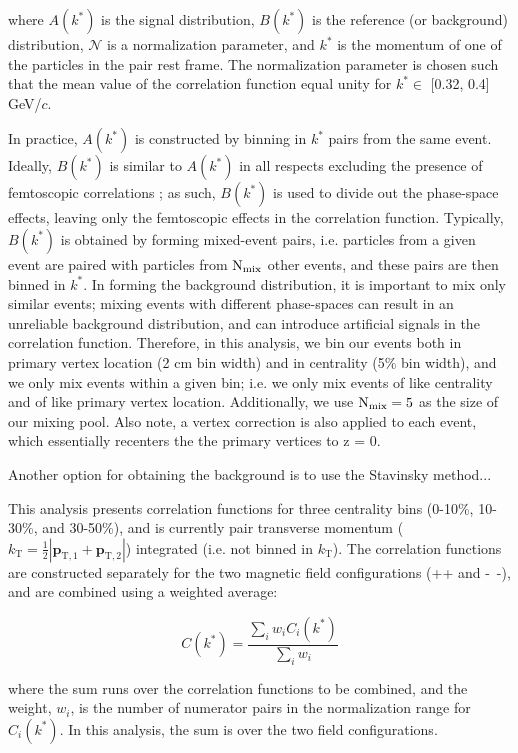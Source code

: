 \documentclass[ALICE,manyauthors]{cernphprep}
\newcommand{\kstar}{$k^{*}$\xspace}
\begin{document}
where $A(k^{*})$ is the signal distribution, $B(k^{*})$ is the reference (or background) distribution, $\mathcal{N}$ is a normalization parameter, and $k^{*}$ is the momentum of one of the particles in the pair rest frame.  The normalization parameter is chosen such that the mean value of the correlation function equal unity for \kstar $\in$ [0.32, 0.4] GeV/$c$.


In practice, $A(k^{*})$ is constructed by binning in \kstar pairs from the same event.
Ideally, $B(k^{*})$ is similar to $A(k^{*})$ in all respects excluding the presence of femtoscopic correlations \cite{Lisa:2005dd}; as such, $B(k^{*})$ is used to divide out the phase-space effects, leaving only the femtoscopic effects in the correlation function. 
Typically, $B(k^{*})$ is obtained by forming mixed-event pairs, i.e. particles from a given event are paired with particles from $\rm N_{mix}$ other events, and these pairs are then binned in \kstar.
In forming the background distribution, it is important to mix only similar events; mixing events with different phase-spaces can result in an unreliable background distribution, and can introduce artificial signals in the correlation function.
Therefore, in this analysis, we bin our events both in primary vertex location (2 cm bin width) and in centrality (5\% bin width), and we only mix events within a given bin; i.e. we only mix events of like centrality and of like primary vertex location.
Additionally, we use $\rm N_{mix} = 5$ as the size of our mixing pool.
Also note, a vertex correction is also applied to each event, which essentially recenters the the primary vertices to z = 0.

Another option for obtaining the background is to use the Stavinsky method...

This analysis presents correlation functions for three centrality bins (0-10\%, 10-30\%, and 30-50\%), and is currently pair transverse momentum ($k_{\mathrm{T}} = \frac{1}{2}|\mathbf{p}_{\mathrm{T,1}}+\mathbf{p}_{\mathrm{T,2}}|$) integrated (i.e. not binned in $k_{\mathrm{T}}$).  
The correlation functions are constructed separately for the two magnetic field configurations (++ and -~-), and are combined using a weighted average:

\begin{equation}
  C(k^{*}) = \frac{\sum\limits_{i}w_{i}C_{i}(k^{*})}{\sum\limits_{i}w_{i}} 
\label{eqn:CombineCfs}
\end{equation}

where the sum runs over the correlation functions to be combined, and the weight, $w_{i}$, is the number of numerator pairs in the normalization range for $C_{i}(k^{*})$.
In this analysis, the sum is over the two field configurations.
\end{document}
